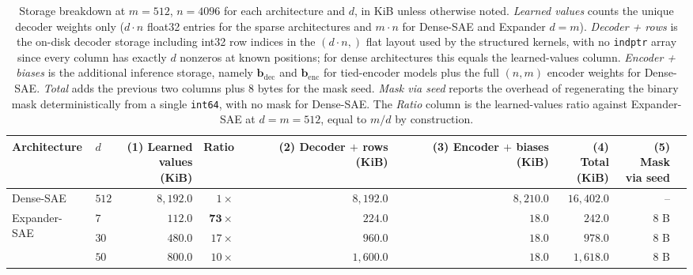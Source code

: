 \documentclass{article}
\theoremstyle{plain}
\theoremstyle{definition}
\theoremstyle{remark}
\begin{document}
\begin{table}[h]
    \centering
    \caption{Storage breakdown at $m{=}512$, $n{=}4096$ for each architecture and $d$, in KiB unless otherwise noted. \emph{Learned values} counts the unique decoder weights only ($d \cdot n$ float32 entries for the sparse architectures and $m \cdot n$ for Dense-SAE and Expander $d{=}m$). \emph{Decoder + rows} is the on-disk decoder storage including int32 row indices in the $(d \cdot n,)$ flat layout used by the structured kernels, with no \texttt{indptr} array since every column has exactly $d$ nonzeros at known positions; for dense architectures this equals the learned-values column. \emph{Encoder + biases} is the additional inference storage, namely $\mathbf{b}_{\mathrm{dec}}$ and $\mathbf{b}_{\mathrm{enc}}$ for tied-encoder models plus the full $(n, m)$ encoder weights for Dense-SAE. \emph{Total} adds the previous two columns plus $8$ bytes for the mask seed. \emph{Mask via seed} reports the overhead of regenerating the binary mask deterministically from a single \texttt{int64}, with no mask for Dense-SAE. The \emph{Ratio} column is the learned-values ratio against Expander-SAE at $d{=}m{=}512$, equal to $m/d$ by construction.}
    \label{tab:bench_storage}
    \small
    \setlength{\tabcolsep}{5pt}
    \begin{tabular}{llrrrrrrr}
        \toprule
        Architecture & $d$ & \shortstack{(1) Learned\\values (KiB)} & Ratio & \shortstack{(2) Decoder\\$+$ rows (KiB)} & \shortstack{(3) Encoder\\$+$ biases (KiB)} & \shortstack{(4) Total\\(KiB)} & \shortstack{(5) Mask\\via seed} \\
        \midrule
        Dense-SAE                & $512$       & $8{,}192.0$ & $1\times$ & $8{,}192.0$ & $8{,}210.0$ & $16{,}402.0$ & --   \\
        \midrule
        \multirow{6}{*}{Expander-SAE}
                                 & $7$         & $\mathbf{112.0}$  & $\mathbf{73\times}$ & $\mathbf{224.0}$  & $18.0$ & $\mathbf{242.0}$  & $8$ B \\
                                 & $30$        & $480.0$    & $17\times$  & $960.0$    & $18.0$ & $978.0$    & $8$ B \\
                                 & $50$        & $800.0$    & $10\times$  & $1{,}600.0$ & $18.0$ & $1{,}618.0$ & $8$ B \\

\end{tabular}
\end{table}
\end{document}
